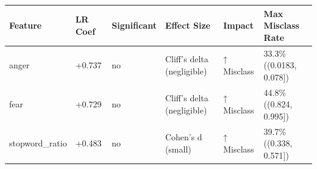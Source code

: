\begin{tabular}{llllll}
\toprule
Feature & LR Coef & Significant & Effect Size & Impact & Max Misclass Rate \\
\midrule
anger & +0.737 & no & Cliff's delta (negligible) & ↑ Misclass & 33.3\% ((0.0183, 0.078]) \\
fear & +0.729 & no & Cliff's delta (negligible) & ↑ Misclass & 44.8\% ((0.824, 0.995]) \\
stopword\_ratio & +0.483 & no & Cohen's d (small) & ↑ Misclass & 39.7\% ((0.338, 0.571]) \\
\bottomrule
\end{tabular}
